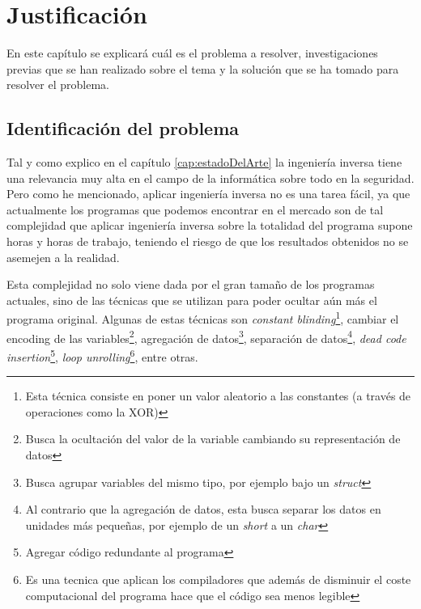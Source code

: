 \chapter{Justificación}
\label{cap:justificacion}


En este capítulo se explicará cuál es el problema a resolver, investigaciones previas
que se han realizado sobre el tema y la solución que se ha tomado para resolver el problema.

\section{Identificación del problema}
\label{sec:problema}


Tal y como explico en el capítulo \ref{cap:estadoDelArte} la ingeniería inversa tiene
una relevancia muy alta en el campo de la informática sobre todo en la seguridad. Pero como he
mencionado, aplicar ingeniería inversa no es una tarea fácil, ya que actualmente los
programas que podemos encontrar en el mercado son de tal complejidad que aplicar
ingeniería inversa sobre la totalidad del programa supone horas y horas de trabajo,
teniendo el riesgo de que los resultados obtenidos no se asemejen a la realidad.

Esta complejidad no solo viene dada por el gran tamaño de los programas actuales, sino
de las técnicas que se utilizan para poder ocultar aún más el programa original. Algunas
de estas técnicas son \textit{constant blinding}\footnote{Esta técnica consiste en poner
un valor aleatorio a las constantes (a través de operaciones como la XOR)}, cambiar el
encoding de las variables\footnote{Busca la ocultación del valor de la variable cambiando
su representación de datos}, agregación de datos\footnote{Busca agrupar variables del mismo
tipo, por ejemplo bajo un \textit{struct}}, separación de datos\footnote{Al contrario que
la agregación de datos, esta busca separar los datos en unidades más pequeñas, por ejemplo
de un \textit{short} a un \textit{char}}, \textit{dead code insertion}\footnote{Agregar
código redundante al programa}, \textit{loop unrolling}\footnote{Es una tecnica que aplican
los compiladores que además de disminuir el coste computacional del programa hace que el
código sea menos legible}, entre otras. \cite{TecnicasIlegibleBinario}

